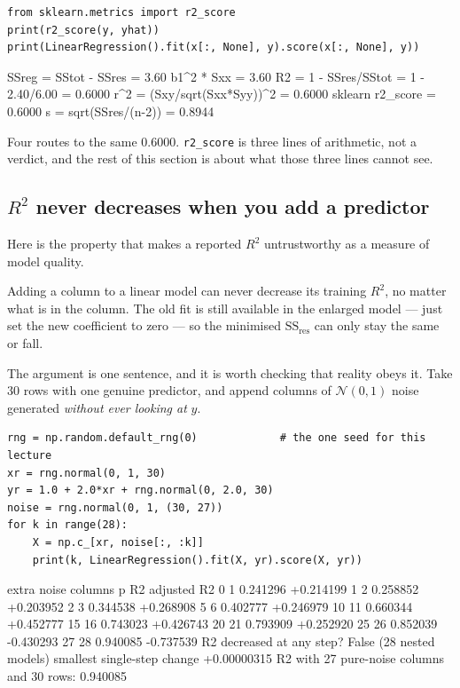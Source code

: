\documentclass[11pt]{article}
\begin{document}
\begin{lstlisting}
from sklearn.metrics import r2_score
print(r2_score(y, yhat))
print(LinearRegression().fit(x[:, None], y).score(x[:, None], y))
\end{lstlisting}
\begin{codeout}
SSreg = SStot - SSres = 3.60      b1^2 * Sxx = 3.60
R2 = 1 - SSres/SStot = 1 - 2.40/6.00 = 0.6000
r^2 = (Sxy/sqrt(Sxx*Syy))^2 = 0.6000
sklearn r2_score            = 0.6000
s = sqrt(SSres/(n-2))       = 0.8944
\end{codeout}

Four routes to the same $0.6000$. \texttt{r2\_score} is three lines of
arithmetic, not a verdict, and the rest of this section is about what those
three lines cannot see.

\subsection{$R^2$ never decreases when you add a predictor}
\label{sec:noisecols}

Here is the property that makes a reported $R^2$ untrustworthy as a measure of
model quality.

\begin{keyidea}
Adding a column to a linear model can never decrease its training $R^2$, no
matter what is in the column. The old fit is still available in the enlarged
model --- just set the new coefficient to zero --- so the minimised
$\mathrm{SS_{res}}$ can only stay the same or fall.
\end{keyidea}

The argument is one sentence, and it is worth checking that reality obeys it.
Take $30$ rows with one genuine predictor, and append columns of
$\mathcal{N}(0,1)$ noise generated \emph{without ever looking at} $y$.

\begin{lstlisting}
rng = np.random.default_rng(0)             # the one seed for this lecture
xr = rng.normal(0, 1, 30)
yr = 1.0 + 2.0*xr + rng.normal(0, 2.0, 30)
noise = rng.normal(0, 1, (30, 27))
for k in range(28):
    X = np.c_[xr, noise[:, :k]]
    print(k, LinearRegression().fit(X, yr).score(X, yr))
\end{lstlisting}
\begin{codeout}
  extra noise columns   p   R2        adjusted R2
         0             1   0.241296   +0.214199
         1             2   0.258852   +0.203952
         2             3   0.344538   +0.268908
         5             6   0.402777   +0.246979
        10            11   0.660344   +0.452777
        15            16   0.743023   +0.426743
        20            21   0.793909   +0.252920
        25            26   0.852039   -0.430293
        27            28   0.940085   -0.737539
R2 decreased at any step?  False   (28 nested models)
smallest single-step change +0.00000315
R2 with 27 pure-noise columns and 30 rows: 0.940085
\end{codeout}
\end{document}
